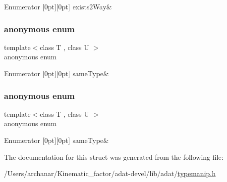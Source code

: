 \begin{DoxyEnumFields}{Enumerator}
[0pt][0pt]{}\mbox{\label{structUtil_1_1Conversion_aaa3b3e4fee0a3d87951a2e788aaa14aba57b873c1826056eca5f6fb7d56ccb11f}} 
exists2\+Way&\\
\hline

\end{DoxyEnumFields}
\mbox{\label{structUtil_1_1Conversion_a4da7b6dc72f967fd56f78ae38dc05595}} 
\subsubsection{\texorpdfstring{anonymous enum}{anonymous enum}}
{\footnotesize\ttfamily template$<$class T , class U $>$ \\
anonymous enum}

\begin{DoxyEnumFields}{Enumerator}
[0pt][0pt]{}\mbox{\label{structUtil_1_1Conversion_a4da7b6dc72f967fd56f78ae38dc05595a13c57e92754abd0dafc432097f46553d}} 
same\+Type&\\
\hline

\end{DoxyEnumFields}
\mbox{\label{structUtil_1_1Conversion_a7744a2074e1793cc7f1de1799d3e1b01}} 
\subsubsection{\texorpdfstring{anonymous enum}{anonymous enum}}
{\footnotesize\ttfamily template$<$class T , class U $>$ \\
anonymous enum}

\begin{DoxyEnumFields}{Enumerator}
[0pt][0pt]{}\mbox{\label{structUtil_1_1Conversion_a4da7b6dc72f967fd56f78ae38dc05595a13c57e92754abd0dafc432097f46553d}} 
same\+Type&\\
\hline

\end{DoxyEnumFields}


The documentation for this struct was generated from the following file\+:\begin{DoxyCompactItemize}
\item 
/\+Users/archanar/\+Kinematic\+\_\+factor/adat-\/devel/lib/adat/\mbox{\hyperlink{adat-devel_2lib_2adat_2typemanip_8h}{typemanip.\+h}}\end{DoxyCompactItemize}
